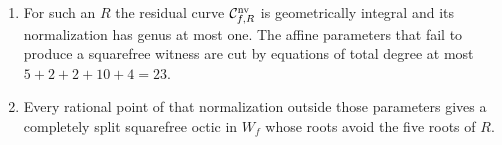 \begin{lemma}
\begin{enumerate}[label=\textup{(\roman*)}]
\[       \autoeqtag{eq:hessian-selector-bound}
      \]
      where $40=8\cdot5$ counts field elements used as candidate root values,
      split into five pairwise disjoint eight-element blocks.
\item For such an $R$ the residual curve $\mathcal C^{\mathrm{nv}}_{f,R}$ is
      geometrically integral and its normalization has genus at most one.  The
      affine parameters that fail to produce a squarefree witness are cut by
      equations of total degree at most $5+2+2+10+4=23$.
\item Every rational point of that normalization outside those parameters gives
      a completely split squarefree octic in $W_f$ whose roots avoid the five
      roots of $R$.
\end{enumerate}
\end{lemma}

